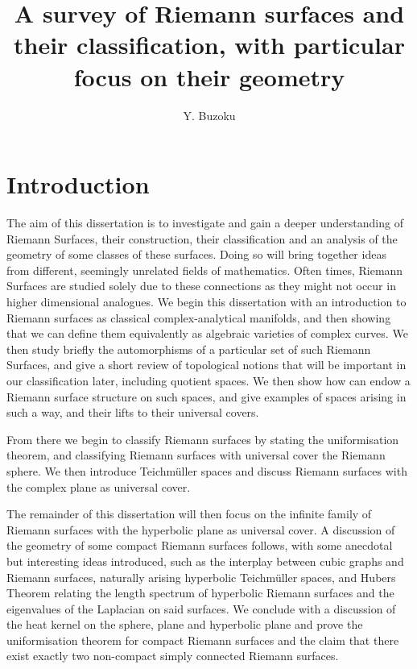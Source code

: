 \documentclass[a4paper,12pt]{report}
\title{A survey of Riemann surfaces and their classification, with particular focus on their geometry}
\author{Y. Buzoku}
\theoremstyle{plain}
\theoremstyle{definition}
\begin{document}
%
\chapter{Introduction}

The aim of this dissertation is to investigate and gain a deeper understanding of
Riemann Surfaces, their construction, their classification and an analysis of the
geometry of some classes of these surfaces. Doing so will bring together ideas
from different, seemingly unrelated fields of mathematics. Often times, Riemann
Surfaces are studied solely due to these connections as they might not occur in
higher dimensional analogues. We begin this dissertation with an introduction to
Riemann surfaces as classical complex-analytical manifolds, and then showing that
we can define them equivalently as algebraic varieties of complex curves. We then 
study briefly the automorphisms of a particular set of such Riemann Surfaces, and 
give a short review of topological notions that will be important in our 
classification later, including quotient spaces. We then show how can endow a 
Riemann surface structure on such spaces, and give examples of spaces arising in such a way, and their lifts to their universal covers.

From there we begin to classify Riemann surfaces by stating the uniformisation 
theorem, and classifying Riemann surfaces with universal cover the Riemann sphere. We then introduce Teichm\"{u}ller spaces and discuss Riemann surfaces with the complex plane as universal cover.

The remainder of this dissertation will then focus on the infinite family of Riemann surfaces with the hyperbolic plane as universal cover. A discussion of the geometry of some compact Riemann surfaces follows, with some anecdotal but interesting ideas introduced, such as the interplay between cubic graphs and Riemann surfaces, naturally arising hyperbolic Teichm\"{u}ller spaces, and Hubers Theorem relating the length spectrum of hyperbolic Riemann surfaces and the eigenvalues of the Laplacian on said surfaces. We conclude with a discussion of the heat kernel on the sphere, plane and hyperbolic plane and prove the uniformisation theorem for compact Riemann surfaces and the claim that there exist exactly two non-compact simply connected Riemann surfaces.
\end{document}
